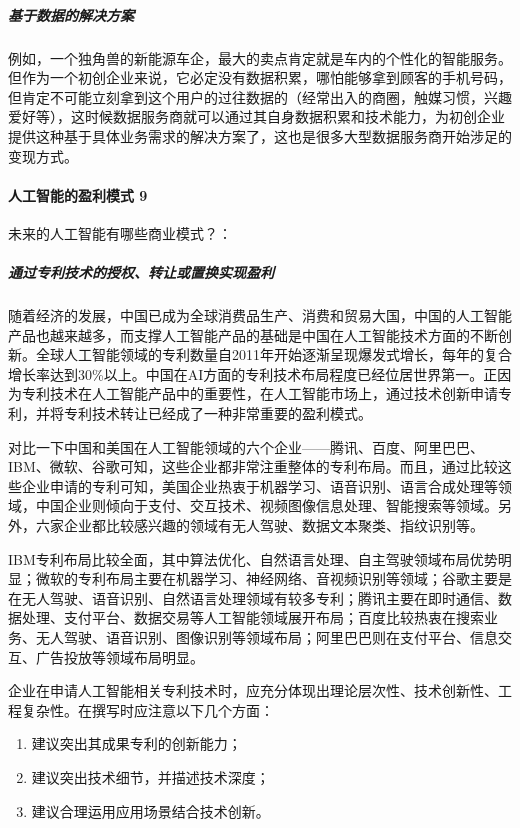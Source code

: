 \documentclass[letterpaper,10pt,english]{sphinxmanual}
\begin{document}
\subparagraph{基于数据的解决方案}
\label{\detokenize{chapter_introduction/money:id20}}
例如，一个独角兽的新能源车企，最大的卖点肯定就是车内的个性化的智能服务。但作为一个初创企业来说，它必定没有数据积累，哪怕能够拿到顾客的手机号码，但肯定不可能立刻拿到这个用户的过往数据的（经常出入的商圈，触媒习惯，兴趣爱好等），这时候数据服务商就可以通过其自身数据积累和技术能力，为初创企业提供这种基于具体业务需求的解决方案了，这也是很多大型数据服务商开始涉足的变现方式。


\paragraph{人工智能的盈利模式 9\sphinxfootnotemark[150]}
\label{\detokenize{chapter_introduction/money:id21}}%
\begin{footnotetext}[150]\sphinxAtStartFootnote
{}
%
\end{footnotetext}\ignorespaces 
未来的人工智能有哪些商业模式？：


\subparagraph{通过专利技术的授权、转让或置换实现盈利}
\label{\detokenize{chapter_introduction/money:id22}}
随着经济的发展，中国已成为全球消费品生产、消费和贸易大国，中国的人工智能产品也越来越多，而支撑人工智能产品的基础是中国在人工智能技术方面的不断创新。全球人工智能领域的专利数量自2011年开始逐渐呈现爆发式增长，每年的复合增长率达到30\%以上。中国在AI方面的专利技术布局程度已经位居世界第一。正因为专利技术在人工智能产品中的重要性，在人工智能市场上，通过技术创新申请专利，并将专利技术转让已经成了一种非常重要的盈利模式。

对比一下中国和美国在人工智能领域的六个企业——腾讯、百度、阿里巴巴、IBM、微软、谷歌可知，这些企业都非常注重整体的专利布局。而且，通过比较这些企业申请的专利可知，美国企业热衷于机器学习、语音识别、语言合成处理等领域，中国企业则倾向于支付、交互技术、视频图像信息处理、智能搜索等领域。另外，六家企业都比较感兴趣的领域有无人驾驶、数据文本聚类、指纹识别等。

IBM专利布局比较全面，其中算法优化、自然语言处理、自主驾驶领域布局优势明显；微软的专利布局主要在机器学习、神经网络、音视频识别等领域；谷歌主要是在无人驾驶、语音识别、自然语言处理领域有较多专利；腾讯主要在即时通信、数据处理、支付平台、数据交易等人工智能领域展开布局；百度比较热衷在搜索业务、无人驾驶、语音识别、图像识别等领域布局；阿里巴巴则在支付平台、信息交互、广告投放等领域布局明显。

企业在申请人工智能相关专利技术时，应充分体现出理论层次性、技术创新性、工程复杂性。在撰写时应注意以下几个方面：
\begin{enumerate}
%
\item {} 
建议突出其成果专利的创新能力；

\item {} 
建议突出技术细节，并描述技术深度；

\item {} 
建议合理运用应用场景结合技术创新。

\end{enumerate}
\end{document}
